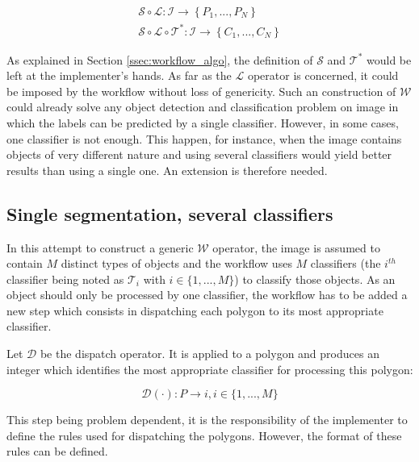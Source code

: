 \begin{eqnarray}
	\label{eqn:segment_locate_base} \mathcal{S} \circ \mathcal{L} : \mathcal{I} \rightarrow \left\{P_1, ..., P_N\right\} \\
	\mathcal{S} \circ \mathcal{L} \circ \mathcal{T}^* : \mathcal{I} \rightarrow \left\{C_1, ..., C_N\right\}
\end{eqnarray}

As explained in Section \ref{ssec:workflow_algo}, the definition of $\mathcal{S}$ and $\mathcal{T}^*$ would be left at the implementer's hands. As far as the $\mathcal{L}$ operator is concerned, it could be imposed by the workflow without loss of genericity. Such an construction of $\mathcal{W}$ could already solve any object detection and classification problem on image in which the labels can be predicted by a single classifier. However, in some cases, one classifier is not enough. This happen, for instance, when the image contains objects of very different nature and using several classifiers would yield better results than using a single one. An extension is therefore needed.

\subsection{Single segmentation, several classifiers}
\label{ssec:single_several}

In this attempt to construct a generic $\mathcal{W}$ operator, the image is assumed to contain $M$ distinct types of objects and the workflow uses $M$ classifiers (the $i^{th}$ classifier being noted as $\mathcal{T}_i$ with $i \in \{1,...,M\}$) to classify those objects. As an object should only be processed by one classifier, the workflow has to be added a new step which consists in dispatching each polygon to its most appropriate classifier. 

\begin{definition}\label{def:dispatch_op} 
	Let $\mathcal{D}$ be the dispatch operator. It is applied to a polygon and produces an integer which identifies the most appropriate classifier for processing this polygon: 

	\begin{equation}
		\mathcal{D}(\cdot) : P \rightarrow i, i \in \{1,...,M\}
	\end{equation}
\end{definition}

This step being problem dependent, it is the responsibility of the implementer to define the rules used for dispatching the polygons. However, the format of these rules can be defined.

